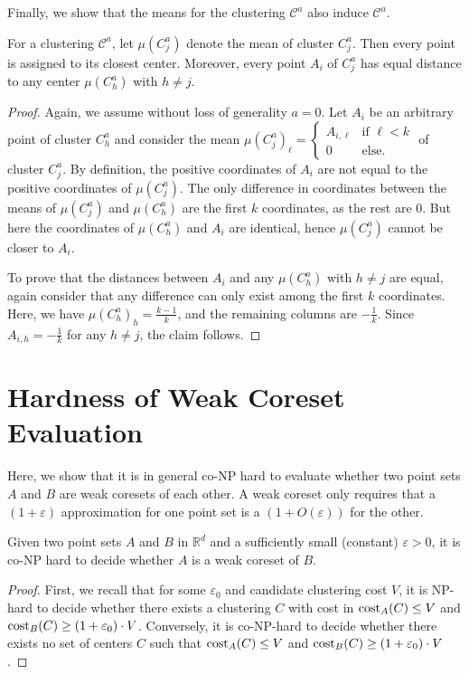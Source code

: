 Finally, we show that the means for the clustering $\mathcal{C}^{a}$ also induce $\mathcal{C}^{a}$.

\begin{fact}
\label{fact:opt}
For a clustering $\mathcal{C}^{a}$, let $\mu(C_j^{a})$ denote the mean of cluster $C_j^a$. Then every point  is assigned to its closest center. Moreover, every point $A_i$ of $C_j^a$ has equal distance to any center $\mu(C_h^{a})$ with $h\neq j$.
\end{fact}
\begin{proof}
Again, we assume without loss of generality $a=0$.
Let $A_i$ be an arbitrary point of cluster $C_{h}^{a}$ and consider the mean $\mu(C_j^a)_{\ell} = \begin{cases}A_{i,\ell} &\text{if }\ell<k \\
0 &\text{else.}\end{cases}$ of cluster $C_j^a$. By definition, the positive coordinates of $A_i$ are not equal to the positive coordinates of $\mu(C_j^a)$. The only difference in coordinates between the means of $\mu(C_j^a)$ and $\mu(C_h^a)$ are the first $k$ coordinates, as the rest are $0$.
But here the coordinates of $\mu(C_h^a)$ and $A_i$ are identical, hence $\mu(C_j^a)$ cannot be closer to $A_i$.

To prove that the distances between $A_i$ and any $\mu(C_h^{a})$ with $h\neq j$ are equal, again consider that any difference can only exist among the first $k$ coordinates. Here, we have $\mu(C_h^{a})_h = \frac{k-1}{k}$, and the remaining columns are $-\frac{1}{k}$. Since $A_{i,h} = -\frac{1}{k}$ for any $h\neq j$, the claim follows.
\end{proof}

\section{Hardness of Weak Coreset Evaluation}

Here, we show that it is in general co-NP hard to evaluate whether two point sets $A$ and $B$ are weak coresets of each other. A weak coreset only requires that a $(1+\varepsilon)$ approximation for one point set is a $(1+O(\varepsilon))$ for the other.


\begin{proposition}
\label{prop:hardness}
Given two point sets $A$ and $B$ in $\mathbb{R}^d$ and a sufficiently small (constant) $\varepsilon>0$, it is co-NP hard to decide whether $A$ is a weak coreset of $B$.
\end{proposition}
\begin{proof}
First, we recall that for some $\varepsilon_0$ and candidate clustering cost $V$, it is NP-hard to decide whether there exists a clustering $C$ with cost in $\text{cost}_A(C)\leq V$ and $\text{cost}_B(C)\geq (1+\varepsilon_0)\cdot V$.
Conversely, it is co-NP-hard to decide whether there exists no set of centers $C$ such that $\text{cost}_A(C)\leq V$ and $\text{cost}_B(C) \geq (1+\varepsilon_0)\cdot V$.
\end{proof}

